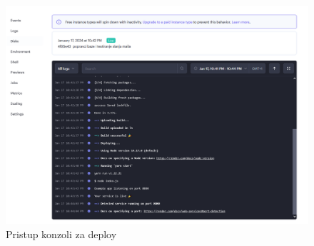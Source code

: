 				\begin{figure}[H]
					\centering
					\includegraphics[width=\textwidth]{slike/render_deploy_status.png}
					\caption{Pristup konzoli za deploy}
					\label{fig: Render deploz console back}
				\end{figure}
			\eject 